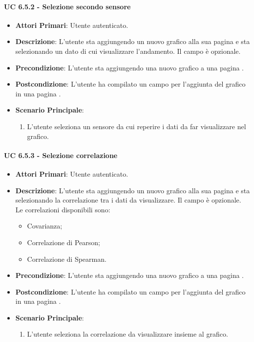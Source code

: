 			\paragraph{UC 6.5.2 - Selezione secondo sensore}
			\begin{itemize}
				\item \textbf{Attori Primari}: Utente autenticato.
				\item \textbf{Descrizione}: L'utente sta aggiungendo un nuovo grafico alla sua pagina  e sta selezionando un dato di cui visualizzare l'andamento. Il campo è opzionale.
				\item \textbf{Precondizione}: L'utente sta aggiungendo una nuovo grafico a una pagina .
				\item \textbf{Postcondizione}: L'utente ha compilato un campo per l'aggiunta del grafico in una pagina .
				\item \textbf{Scenario Principale}:
				\begin{enumerate}
					\item{L'utente seleziona un sensore da cui reperire i dati da far visualizzare nel grafico.}
				\end{enumerate}	
			\end{itemize}

			\paragraph{UC 6.5.3 - Selezione correlazione}
			\begin{itemize}
				\item \textbf{Attori Primari}: Utente autenticato.
				\item \textbf{Descrizione}: L'utente sta aggiungendo un nuovo grafico alla sua pagina  e sta selezionando la correlazione tra i dati da visualizzare. Il campo è opzionale. Le correlazioni disponibili sono:
				\begin{itemize}
					\item Covarianza;
					\item Correlazione di Pearson;
					\item Correlazione di Spearman.
				\end{itemize}
				\item \textbf{Precondizione}: L'utente sta aggiungendo una nuovo grafico a una pagina .
				\item \textbf{Postcondizione}: L'utente ha compilato un campo per l'aggiunta del grafico in una pagina .
				\item \textbf{Scenario Principale}:
				\begin{enumerate}
					\item{L'utente seleziona la correlazione da visualizzare insieme al grafico.}
				\end{enumerate}	
			\end{itemize}

